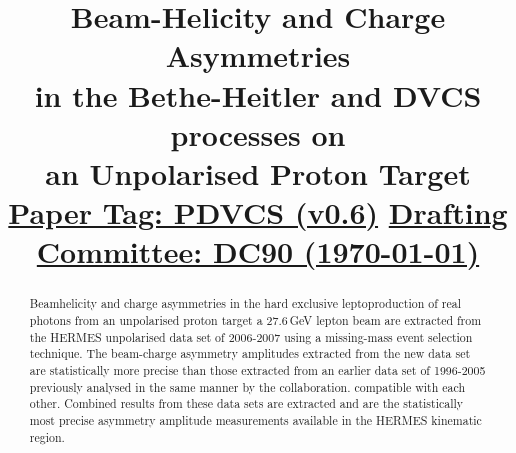 \documentclass{elsart}
\begin{document}
 \begin{frontmatter}

\title{
	Beam-Helicity and Charge Asymmetries \\
        in the Bethe-Heitler and DVCS processes on \\
        an Unpolarised Proton Target
  	\underline{Paper Tag: PDVCS (v0.6)}
        \underline{Drafting Committee: DC90 (\today)}
}

\begin{abstract}
Beam\blue{-}helicity and charge asymmetries in the hard exclusive leptoproduction of
real photons from an unpolarised proton target  a 27.6\,GeV lepton beam 
are extracted from the HERMES unpolarised data set of 2006-2007 using a
missing-mass event selection technique. The beam-charge asymmetry amplitudes extracted from the new data set are statistically more precise than those extracted from an earlier data set of 1996-2005 previously analysed in the same manner by the collaboration.  compatible with each other. Combined results from these data sets are extracted and are the statistically most precise asymmetry amplitude measurements available in the HERMES kinematic region.
\end{abstract}

\end{frontmatter}
% 
\setvruler[15pt][1][1][3][1][30pt][30pt][-42pt]








\end{document}
